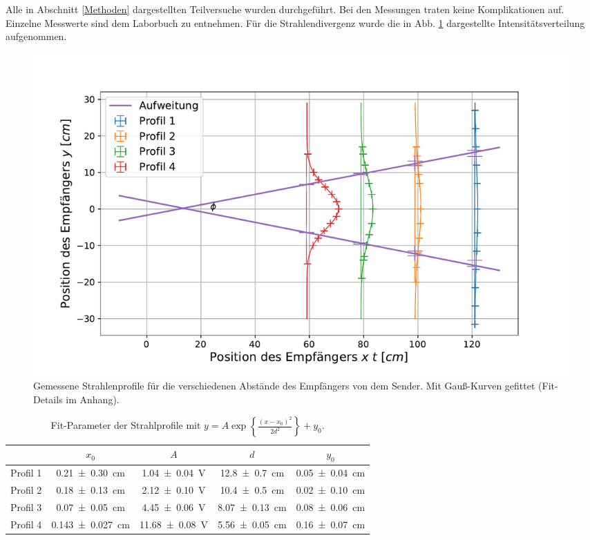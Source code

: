 		Alle in Abschnitt \ref{Methoden} dargestellten Teilversuche wurden durchgeführt.
		Bei den Messungen traten keine Komplikationen auf.
		Einzelne Messwerte sind dem Laborbuch zu entnehmen.
		Für die Strahlendivergenz wurde die in Abb. \ref{fig:divergenz} dargestellte Intensitätsverteilung aufgenommen. 
		\begin{figure}[ht]
			\centering
			\includegraphics[width=\textwidth]{data/profil.pdf}
			\caption{Gemessene Strahlenprofile für die verschiedenen Abstände des Empfängers von dem Sender. Mit Gauß-Kurven gefittet (Fit-Details im Anhang).}
			\label{fig:divergenz}	
		\end{figure}
	
		\begin{table}[ht]
			\centering
			\begin{tabular}{r|SSSS}
				\hline
				& $x_0$ & $A$ & $d$ & $y_0$ \\
				\hline
				{Profil 1} & \SI{0.21+-0.30}{\centi\meter} & \SI{1.04+-0.04}{\volt} & \SI{12.8+-0.7}{\centi\meter} & \SI{0.05+-0.04}{\centi\meter}\\
				{Profil 2} & \SI{0.18+-0.13}{\centi\meter} & \SI{2.12+-0.10}{\volt} & \SI{10.4+-0.5}{\centi\meter} & \SI{0.02+-0.10}{\centi\meter}\\
				{Profil 3} & \SI{0.07+-0.05}{\centi\meter} & \SI{4.45+-0.06}{\volt} & \SI{8.07+-0.13}{\centi\meter} & \SI{0.08+-0.06}{\centi\meter}\\
				{Profil 4} & \SI{0.143+-0.027}{\centi\meter} & \SI{11.68+-0.08}{\volt} & \SI{5.56+-0.05}{\centi\meter} & \SI{0.16+-0.07}{\centi\meter}\\
				\hline
			\end{tabular}
			\caption{Fit-Parameter der Strahlprofile mit $y = A \exp\left\lbrace \frac{(x-x_0)^2}{2 d^2} \right\rbrace + y_0$.}
			\label{tab:strahlendivFit}
		\end{table}

